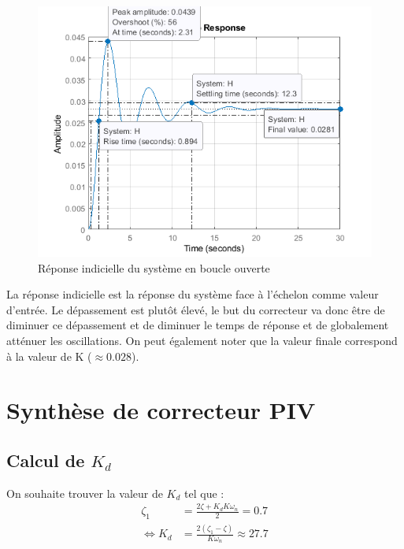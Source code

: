 \documentclass{article}
\begin{document}
\begin{figure}[h]
    \centering
    \includegraphics[width=1\linewidth]{step314.png}
    \caption{Réponse indicielle du système en boucle ouverte}
    \label{fig:step314}
\end{figure}

La réponse indicielle est la réponse du système face à l'échelon comme valeur d'entrée. Le dépassement est plutôt élevé, le but du correcteur va donc être de diminuer ce dépassement et de diminuer le temps de réponse et de globalement atténuer les oscillations. On peut également noter que la valeur finale correspond à la valeur de K ($\approx 0.028$).
\section{Synthèse de correcteur PIV}
\subsection{Calcul de $K_d$}
On souhaite trouver la valeur de $K_d$ tel que :
\begin{align*}
    \zeta_1&=\frac{2\zeta+K_dK\omega_n}{2}=0.7\\
    \Leftrightarrow K_d&=\frac{2(\zeta_1-\zeta)}{K\omega_n}\approx27.7
\end{align*}
\end{document}
